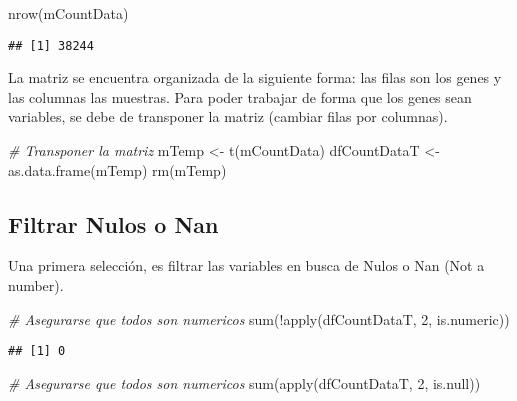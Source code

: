 \documentclass[
]{article}
\newenvironment{Shaded}{\begin{snugshade}}{\end{snugshade}}
\newcommand{\CommentTok}[1]{\textcolor[rgb]{0.56,0.35,0.01}{\textit{#1}}}
\newcommand{\DecValTok}[1]{\textcolor[rgb]{0.00,0.00,0.81}{#1}}
\newcommand{\FunctionTok}[1]{\textcolor[rgb]{0.00,0.00,0.00}{#1}}
\newcommand{\NormalTok}[1]{#1}
\newcommand{\OtherTok}[1]{\textcolor[rgb]{0.56,0.35,0.01}{#1}}
\newcommand{\SpecialCharTok}[1]{\textcolor[rgb]{0.00,0.00,0.00}{#1}}
\begin{document}
\begin{Shaded}
\begin{Highlighting}[]
\FunctionTok{nrow}\NormalTok{(mCountData)}
\end{Highlighting}
\end{Shaded}

\begin{verbatim}
## [1] 38244
\end{verbatim}

La matriz se encuentra organizada de la siguiente forma: las filas son
los genes y las columnas las muestras. Para poder trabajar de forma que
los genes sean variables, se debe de transponer la matriz (cambiar filas
por columnas).

\begin{Shaded}
\begin{Highlighting}[]
\CommentTok{\# Transponer la matriz}
\NormalTok{mTemp }\OtherTok{\textless{}{-}} \FunctionTok{t}\NormalTok{(mCountData)}
\NormalTok{dfCountDataT }\OtherTok{\textless{}{-}} \FunctionTok{as.data.frame}\NormalTok{(mTemp)}
\FunctionTok{rm}\NormalTok{(mTemp)}
\end{Highlighting}
\end{Shaded}

\hypertarget{filtrar-nulos-o-nan}{%
\subsection{Filtrar Nulos o Nan}\label{filtrar-nulos-o-nan}}

Una primera selección, es filtrar las variables en busca de Nulos o Nan
(Not a number).

\begin{Shaded}
\begin{Highlighting}[]
\CommentTok{\# Asegurarse que todos son numericos}
\FunctionTok{sum}\NormalTok{(}\SpecialCharTok{!}\FunctionTok{apply}\NormalTok{(dfCountDataT, }\DecValTok{2}\NormalTok{, is.numeric))}
\end{Highlighting}
\end{Shaded}

\begin{verbatim}
## [1] 0
\end{verbatim}

\begin{Shaded}
\begin{Highlighting}[]
\CommentTok{\# Asegurarse que todos son numericos}
\FunctionTok{sum}\NormalTok{(}\FunctionTok{apply}\NormalTok{(dfCountDataT, }\DecValTok{2}\NormalTok{, is.null))}
\end{Highlighting}
\end{Shaded}
\end{document}
